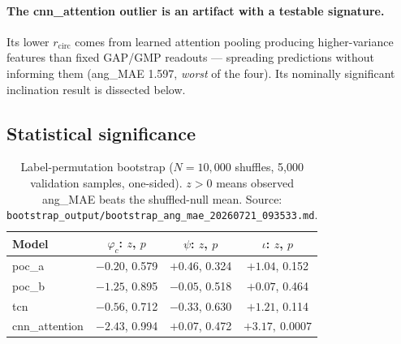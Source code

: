 \paragraph{The cnn\_attention outlier is an artifact with a testable signature.}
Its lower $r_{\mathrm{circ}}$ comes from learned attention pooling producing higher-variance features than fixed GAP/GMP readouts --- spreading predictions without informing them (ang\_MAE 1.597, \emph{worst} of the four).
Its nominally significant inclination result is dissected below.

\subsection{Statistical significance}
\label{sec:phicpsi:bootstrap}

\begin{table}[tbp]
    \centering
    \caption{Label-permutation bootstrap ($N = 10{,}000$ shuffles,
        5{,}000 validation samples, one-sided). $z > 0$ means observed
        ang\_MAE beats the shuffled-null mean.
        Source: \texttt{bootstrap\_output/bootstrap\_ang\_mae\_20260721\_093533.md}.}
    \label{tab:phicpsi:bootstrap}
    \small
    \begin{tabular}{@{}lccc@{}}
        \toprule
        Model          & $\varphi_c$: $z$, $p$ & $\psi$: $z$, $p$ & $\iota$: $z$, $p$         \\
        \midrule
        poc\_a         & $-0.20$, 0.579        & $+0.46$, 0.324   & $+1.04$, 0.152            \\
        poc\_b         & $-1.25$, 0.895        & $-0.05$, 0.518   & $+0.07$, 0.464            \\
        tcn            & $-0.56$, 0.712        & $-0.33$, 0.630   & $+1.21$, 0.114            \\
        cnn\_attention & $-2.43$, 0.994        & $+0.07$, 0.472   & $\mathbf{+3.17,\ 0.0007}$ \\
        \bottomrule
    \end{tabular}
\end{table}

